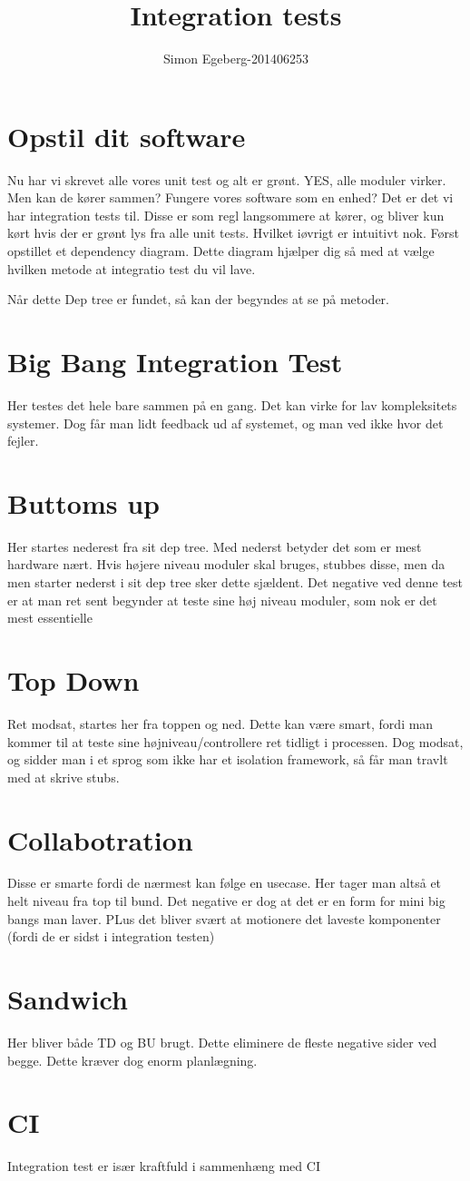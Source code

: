 \documentclass{article}
\title{Integration tests}
\author{Simon Egeberg-201406253}
\begin{document}
\maketitle
\section{Opstil dit software}
Nu har vi skrevet alle vores unit test og alt er grønt. YES, alle moduler virker. Men kan de kører sammen? Fungere vores software som en enhed?
Det er det vi har integration tests til. Disse er som regl langsommere at kører, og bliver kun kørt hvis der er grønt lys fra alle unit tests. Hvilket iøvrigt er intuitivt nok. 
Først opstillet et dependency diagram. Dette diagram hjælper dig så med at vælge hvilken metode at integratio test du vil lave.

Når dette Dep tree er fundet, så kan der begyndes at se på metoder. 
\section{Big Bang Integration Test}
Her testes det hele bare sammen på en gang. Det kan virke for lav kompleksitets systemer. Dog får man lidt feedback ud af systemet, og man ved ikke hvor det fejler.

\section{Buttoms up}
Her startes nederest fra sit dep tree. Med nederst betyder det som er mest hardware nært. Hvis højere niveau moduler skal bruges, stubbes disse, men da men starter nederst i sit dep tree sker dette sjældent. Det negative ved denne test er at man ret sent begynder at teste sine høj niveau moduler, som nok er det mest essentielle

\section{Top Down}
Ret modsat, startes her fra toppen og ned. Dette kan være smart, fordi man kommer til at teste sine højniveau/controllere ret tidligt i processen. Dog modsat, og sidder man i et sprog som ikke har et isolation framework, så får man travlt med at skrive stubs. 

\section{Collabotration}
Disse er smarte fordi de nærmest kan følge en usecase. Her tager man altså et helt niveau fra top til bund. Det negative er dog at det er en form for mini big bangs man laver. PLus det bliver svært at motionere det laveste komponenter (fordi de er sidst i integration testen)

\section{Sandwich}
Her bliver både TD og BU brugt. Dette eliminere de fleste negative sider ved begge. Dette kræver dog enorm planlægning.

\section{CI}
Integration test er især kraftfuld i sammenhæng med CI
\end{document}
